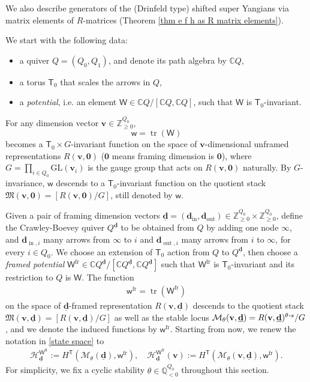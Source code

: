 \documentclass[10pt]{amsart}
\theoremstyle{definition}
\numberwithin{equation}{section}
\newcommand{\GL}{\mathrm{GL}}
\newcommand{\bC}{\mathbb{C}}
\newcommand{\bQ}{\mathbb{Q}}
\newcommand{\bZ}{\mathbb{Z}}
\newcommand{\bv}{\mathbf{v}}
\newcommand{\bd}{\mathbf{d}}
\newcommand{\cM}{\mathcal{M}}
\newcommand{\fM}{\mathfrak{M}}
\newcommand{\sT}{\mathsf{T}}
\newcommand{\sW}{\mathsf{W}}
\newcommand{\sw}{\mathsf{w}}
\newcommand{\tr}{\operatorname{tr}}
\newcommand{\In}{\operatorname{in}}
\newcommand{\Out}{\operatorname{out}}
\newcommand{\yl}[1]{\textcolor{blue}{$[$ Yalong: #1 $]$}}
\begin{document}
We also describe generators of the (Drinfeld type) shifted super Yangians via matrix elements of $R$-matrices (Theorem \ref{thm e f h as R matrix elements}).


We start with the following data:
\begin{itemize}
    \item a quiver $Q=(Q_0,Q_1)$, and denote its path algebra by $\bC Q$,
    \item a torus $\sT_0$ that scales the arrows in $Q$,
    \item a \textit{potential}, i.e. an element $\sW\in \bC Q/[\bC Q,\bC Q]$, such that $\sW$ is $\sT_0$-invariant.
\end{itemize}
For any dimension vector $\bv\in \bZ_{\geqslant 0}^{Q_0}$, $$\sw=\tr(\sW)$$ becomes a $\sT_0\times G$-invariant function on the space of $\bv$-dimensional unframed representations $R(\bv,\mathbf 0)$ ($\mathbf 0$ means framing dimension is $\mathbf 0$), where $G=\prod_{i\in Q_0}\GL(\bv_i)$ is the gauge group that acts on $R(\bv,\mathbf 0)$ naturally. By $G$-invariance, $\sw$ descends to a $\sT_0$-invariant function on the quotient stack $\fM(\bv,\mathbf 0)=[R(\bv,\mathbf 0)/G]$, still denoted by $\sw$.

Given a pair of framing dimension vectors $\underline{\bd}=(\bd_{\In},\bd_{\Out})\in \bZ_{\geqslant 0}^{Q_0}\times \bZ_{\geqslant 0}^{Q_0}$, define the Crawley-Boevey quiver $Q^{\underline{\bd}}$ to be obtained from $Q$ by adding one node $\infty$, and $\bd_{\In ,i}$ many arrows from $\infty$ to $i$ and $\bd_{\Out ,i}$ many arrows from $i$ to $\infty$, for every $i\in Q_0$. We choose an extension of $\sT_0$ action from $Q$ to $Q^{\underline{\bd}}$, then choose a \textit{framed potential} $\sW^{\mathrm{fr}}\in \bC Q^{\underline{\bd}}/[\bC Q^{\underline{\bd}},\bC Q^{\underline{\bd}}]$ such that $\sW^{\mathrm{fr}}$ is $\sT_0$-invariant and its restriction to $Q$ is $\sW$. The function 
\begin{align*}
    \sw^{\mathrm{fr}}=\tr(\sW^{\mathrm{fr}})
\end{align*}
on the space of $\underline{\bd}$-framed representation $R(\bv,\underline{\bd})$ descends to the quotient stack $\fM(\bv,\underline{\bd})=[R(\bv,\underline{\bd})/G]$ as well as the stable locus $\cM_\theta(\bv,\underline{\bd})=R(\bv,\underline{\bd})^{\theta\emph{-}s}/G$, and we denote the induced functions by $\sw^{\mathrm{fr}}$. Starting from now, we renew the notation in \eqref{state space} to
\begin{align*}
\mathcal H_{\underline{\bd}}^{\sW^{\mathrm{fr}}}:=H^\sT(\cM_\theta(\underline{\bd}),\sw^{\mathrm{fr}}),\quad \mathcal H_{\underline{\bd}}^{\sW^{\mathrm{fr}}}(\bv):=H^\sT(\cM_\theta(\bv,\underline{\bd}),\sw^{\mathrm{fr}}).
\end{align*}
For simplicity, we fix a cyclic stability $\theta\in \bQ_{<0}^{Q_0}$ throughout this section.
\end{document}
